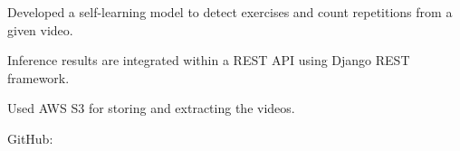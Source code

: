 \begin{resume_list}
  \item Developed a self-learning model to detect exercises and count repetitions from a given video.
  \item Inference results are integrated within a REST API using Django REST framework.
  \item Used AWS S3 for storing and extracting the videos.
  \item GitHub: 
\end{resume_list}

